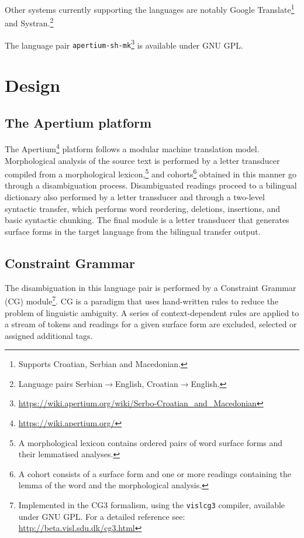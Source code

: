 \documentclass{book}
\begin{document}
Other systems currently supporting the languages are notably Google Translate\footnote{Supports Croatian, Serbian and Macedonian.} and Systran.\footnote{Language pairs Serbian$\rightarrow$English, Croatian$\rightarrow$English.}

The language pair {\small{\tt apertium-sh-mk}}\footnote{\url{https://wiki.apertium.org/wiki/Serbo-Croatian_and_Macedonian}} is available under GNU GPL.

\mainmatter

\section{Design}
\subsection* {The Apertium platform}
\nocite{forcada2011apertium}
The Apertium\footnote{\url{https://wiki.apertium.org/}}  platform follows a modular machine translation model.
Morphological analysis of the source text is performed by a letter 
transducer compiled from a morphological lexicon,\footnote{A morphological lexicon 
contains ordered pairs of word surface forms and their lemmatised analyses.} 
and cohorts\footnote{A cohort 
consists of a surface form and one or more readings containing the lemma of the 
word and the morphological analysis.} obtained in this manner go through
a disambiguation process. 
Disambiguated readings proceed to a bilingual dictionary also performed 
by a letter transducer and  through a two-level syntactic transfer, 
which performs word reordering, deletions, insertions, and basic syntactic chunking.
The final module is a letter transducer that generates surface forms in the target language from 
the bilingual transfer output.

\subsection* {Constraint Grammar}
The 
disambiguation in this language pair is performed by a
Constraint Grammar (CG) module\footnote{Implemented in the CG3 formalism, using the \texttt{vislcg3} compiler, available under GNU GPL. For a detailed reference see: \url{http://beta.visl.sdu.dk/cg3.html}}. CG is a 
paradigm that uses hand-written rules to reduce the problem 
of linguistic ambiguity. A series of context-dependent rules are applied 
to a stream of tokens and readings for a given surface form are excluded, 
selected or assigned additional tags.
\end{document}
